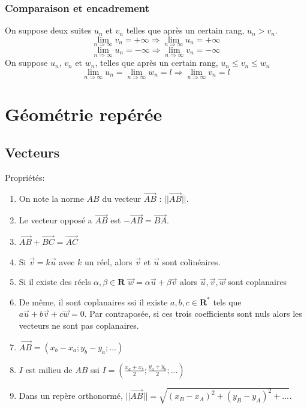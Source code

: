 \documentclass{article}
\begin{document}
\subsubsection{Comparaison et encadrement}
    On suppose deux suites $u_n$ et $v_n$ telles que après un certain rang, $u_n>v_n$.
    $$\lim \limits_{n \Rightarrow \infty} v_n = + \infty \Rightarrow \lim \limits_{n \Rightarrow \infty} u_n = + \infty$$
    $$\lim \limits_{n \Rightarrow \infty} u_n = - \infty \Rightarrow \lim \limits_{n \Rightarrow \infty} v_n = - \infty$$
    On suppose $u_n$, $v_n$ et $w_n$, telles que après un certain rang, $u_n \le v_n \le w_n$
    $$\lim \limits_{n \Rightarrow \infty} u_n = \lim \limits_{n \Rightarrow \infty} w_n = l \Rightarrow \lim \limits_{n \Rightarrow \infty} v_n = l$$



\section{Géométrie repérée}


\subsection{Vecteurs}
    Propriétés:
    \begin{enumerate}
        \item On note la norme $AB$ du vecteur $\Vec{AB}$ : $||\Vec{AB}||$.
        \item Le vecteur opposé a $\Vec{AB}$ est $-\Vec{AB} = \Vec{BA}$.
        \item $\Vec{AB}+\Vec{BC}=\Vec{AC}$
        \item Si $\Vec{v} = k\Vec{u}$ avec $k$ un réel, alors $\Vec{v}$ et $\Vec{u}$ sont colinéaires.
        \item  Si il existe des réels $\alpha,\beta\in\mathbf{R}$ $\Vec{w}=\alpha\Vec{u}+\beta\Vec{v}$ alors $\Vec{u},\Vec{v},\Vec{w}$ sont coplanaires
        \item De même, il sont coplanaires ssi il existe $a,b,c\in\mathbf{R^*}$ tels que $a\Vec{u}+b\Vec{v}+c\Vec{w}=0$. Par contraposée, si ces trois coefficients sont nuls alors les vecteurs ne sont pas coplanaires.
        \item $\Vec{AB} = (x_b - x_a ; y_b - y_a ; ...)$
        \item $I$ est milieu de $AB$ ssi $I=(\frac{x_a+x_b}{2};\frac{y_a+y_b}{2};...)$
        \item Dans un repère orthonormé, $||\Vec{AB}|| = \sqrt{(x_B-x_A)^2+ (y_B-y_A)^2+...}$.
    \end{enumerate}
\end{document}
